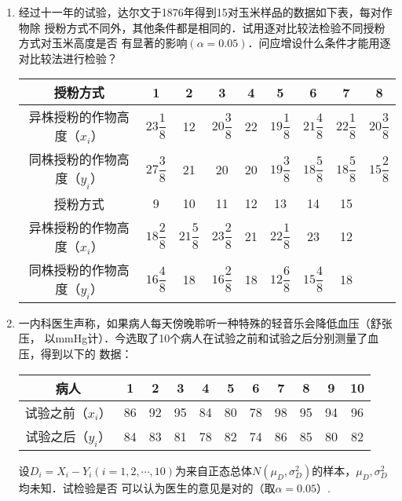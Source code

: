 \documentclass[10pt,a4paper]{article}
\begin{document}
\begin{enumerate}
    \item 经过十一年的试验，达尔文于1876年得到15对玉米样品的数据如下表，每对作物除
    授粉方式不同外，其他条件都是相同的．试用逐对比较法检验不同授粉方式对玉米高度是否
    有显著的影响$(\alpha=0.05)$．问应增设什么条件才能用逐对比较法进行检验？
    \renewcommand{\arraystretch}{2.5}
    \begin{table}[H]\centering
        \begin{tabular}{c|c|c|c|c|c|c|c|c}
        \hline
        授粉方式             & 1                & 2                & 3                & 4  & 5                & 6                & 7                & 8                \\ \hline
        异株授粉的作物高度（$x_i$） & $23\dfrac{1}{8}$ & 12               & $20\dfrac{3}{8}$ & 22 & $19\dfrac{1}{8}$ & $21\dfrac{4}{8}$ & $22\dfrac{1}{8}$ & $20\dfrac{3}{8}$ \\ \hline
        同株授粉的作物高度（$y_i$） & $27\dfrac{3}{8}$ & 21               & 20               & 20 & $19\dfrac{3}{8}$ & $18\dfrac{5}{8}$ & $18\dfrac{5}{8}$ & $15\dfrac{2}{8}$ \\ \hline
        授粉方式             & 9                & 10               & 11               & 12 & 13               & 14               & 15               &                  \\ \hline
        异株授粉的作物高度（$x_i$） & $18\dfrac{2}{8}$ & $21\dfrac{5}{8}$ & $23\dfrac{2}{8}$ & 21 & $22\dfrac{1}{8}$ & 23               & 12               &                  \\ \hline
        同株授粉的作物高度（$y_i$） & $16\dfrac{4}{8}$ & 18               & $16\dfrac{2}{8}$ & 18 & $12\dfrac{6}{8}$ & $15\dfrac{4}{8}$ & 18               &                  \\ \hline
        \end{tabular}
    \end{table}
    \renewcommand{\arraystretch}{1.0}





    \item 一内科医生声称，如果病人每天傍晚聆听一种特殊的轻音乐会降低血压（舒张压，
    以mmHg计）．今选取了10个病人在试验之前和试验之后分别测量了血压，得到以下的
    数据：
    \renewcommand{\arraystretch}{1.3}
    \begin{table}[H]\centering
        \begin{tabular}{c|c|c|c|c|c|c|c|c|c|c}
        \hline
        病人          & 1  & 2  & 3  & 4  & 5  & 6  & 7  & 8  & 9  & 10 \\ \hline
        试验之前（$x_i$） & 86 & 92 & 95 & 84 & 80 & 78 & 98 & 95 & 94 & 96 \\ \hline
        试验之后（$y_i$） & 84 & 83 & 81 & 78 & 82 & 74 & 86 & 85 & 80 & 82 \\ \hline
        \end{tabular}
    \end{table}
    \renewcommand{\arraystretch}{1.0}
    设$D_i=X_i-Y_i(i=1,2,\cdots,10)$为来自正态总体$N(\mu_D,\sigma_D^2)$的样本，$\mu_D,\sigma^2_D$均未知．试检验是否
    可以认为医生的意见是对的（取$\alpha=0.05$）.





\end{enumerate}
\end{document}
